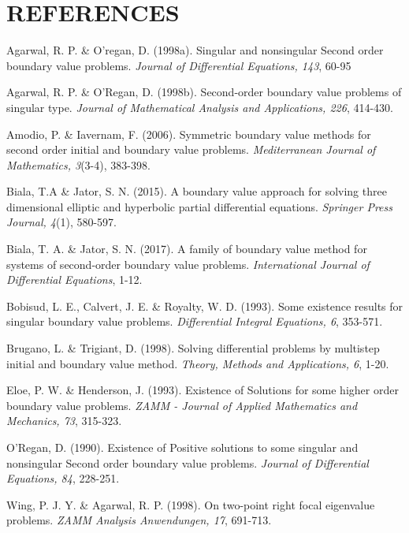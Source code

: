 \documentclass[12pt]{report}
\newcommand{\tti}[1]{\textit{#1}}
\begin{document}
	\chapter*{REFERENCES}
	\begin{description}
		\item Agarwal, R. P. \& O'regan, D. (1998a). Singular and nonsingular Second order boundary value problems. \tti{Journal of Differential Equations, 143}, 60-95
		
		
		\item Agarwal, R. P. \& O'Regan, D. (1998b). Second-order boundary value problems of singular type. \tti{Journal of Mathematical Analysis and Applications, 226}, 414-430.
		
		
		\item Amodio, P. \& Iavernam, F. (2006). Symmetric boundary value methods for second order initial and boundary value problems. \tti{Mediterranean Journal of Mathematics, 3}(3-4), 383-398.
		
		
		\item Biala, T.A \& Jator, S. N. (2015). A boundary value approach for solving three dimensional elliptic and hyperbolic partial differential equations. \tti{Springer Press Journal, 4}(1), 580-597.
		
		
		\item Biala, T. A. \& Jator, S. N. (2017). A family of boundary value method for systems of second-order boundary value problems. \tti{International Journal of Differential Equations}, 1-12.
		
		
		\item Bobisud, L. E., Calvert, J. E. \& Royalty, W. D. (1993). Some existence results for singular boundary value problems. \tti{Differential Integral Equations, 6}, 353-571.
		
		
		\item Brugano, L. \& Trigiant, D. (1998). Solving differential problems by multistep initial and boundary value method. \tti{Theory, Methods and Applications, 6}, 1-20.
		
		
		\item Eloe, P. W. \& Henderson, J. (1993). Existence of Solutions for some higher order boundary value problems. \tti{ZAMM - Journal of Applied Mathematics and Mechanics, 73}, 315-323.
		
		
		\item O'Regan, D. (1990). Existence of Positive solutions to some singular and nonsingular Second order boundary value problems. \tti{Journal of Differential Equations, 84}, 228-251.
		
		
		\item Wing, P. J. Y. \& Agarwal, R. P. (1998). On two-point right focal eigenvalue problems. \tti{ZAMM Analysis Anwendungen, 17}, 691-713. 
		
	\end{description}
\end{document}
